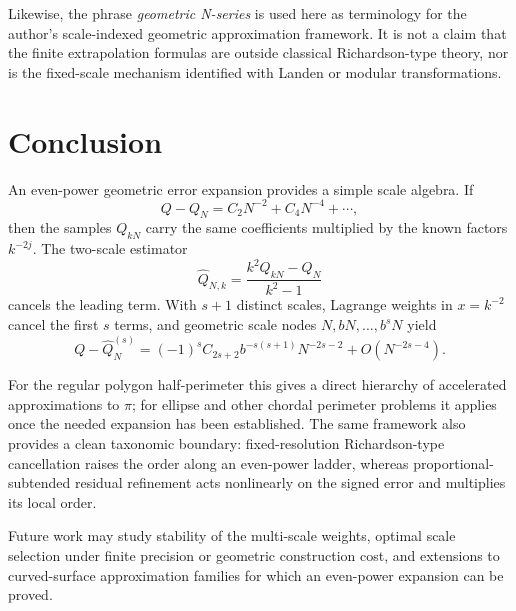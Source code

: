 \documentclass[11pt]{article}
\theoremstyle{remark}
\newcommand{\wideQ}{\widehat{Q}}
\begin{document}
Likewise, the phrase \emph{geometric N-series} is used here as terminology for
the author's scale-indexed geometric approximation framework.  It is not a
claim that the finite extrapolation formulas are outside classical
Richardson-type theory, nor is the fixed-scale mechanism identified with
Landen or modular transformations.

\section{Conclusion}

An even-power geometric error expansion provides a simple scale algebra.  If
\[
Q-Q_N
=
C_2N^{-2}+C_4N^{-4}+\cdots,
\]
then the samples $Q_{kN}$ carry the same coefficients multiplied by the known
factors $k^{-2j}$.  The two-scale estimator
\[
\wideQ_{N,k}
=
\frac{k^2Q_{kN}-Q_N}{k^2-1}
\]
cancels the leading term.  With $s+1$ distinct scales, Lagrange weights in
$x=k^{-2}$ cancel the first $s$ terms, and geometric scale nodes
$N,bN,\ldots,b^sN$ yield
\[
Q-\wideQ_N^{(s)}
=
(-1)^sC_{2s+2}b^{-s(s+1)}N^{-2s-2}
+O(N^{-2s-4}).
\]

For the regular polygon half-perimeter this gives a direct hierarchy of
accelerated approximations to $\pi$; for ellipse and other chordal perimeter
problems it applies once the needed expansion has been established.  The same
framework also provides a clean taxonomic boundary: fixed-resolution
Richardson-type cancellation raises the order along an even-power ladder,
whereas proportional-subtended residual refinement acts nonlinearly on the
signed error and multiplies its local order.

Future work may study stability of the multi-scale weights, optimal scale
selection under finite precision or geometric construction cost, and
extensions to curved-surface approximation families for which an even-power
expansion can be proved.
\end{document}
